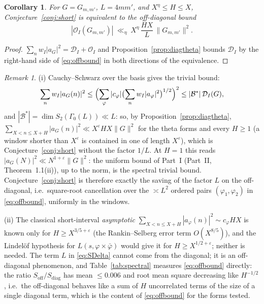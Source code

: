 \documentclass[11pt]{amsart}
\newtheorem{corollary}[theorem]{Corollary}
\theoremstyle{remark}
\newtheorem{remark}[theorem]{Remark}
\newcommand{\cB}{\mathcal{B}}
\newcommand{\e}{\varepsilon}
\begin{document}
\begin{corollary}\label{cor:equiv}
For $G=G_{m,m'}$, $L=4mm'$, and $X^\eta\le H\le X$, Conjecture~\ref{conj:short} is equivalent to the off-diagonal bound
\begin{equation}\label{eq:offbound}
|\mathcal O_I(G_{m,m'})|\ \ll_\eta\ X^{\eta}\,\frac{HX}{L}\,\|G_{m,m'}\|^2 .
\end{equation}
\end{corollary}
\begin{proof}
$\sum_nw_I|a_G|^2=\mathcal D_I+\mathcal O_I$ and Proposition~\ref{prop:diagtheta} bounds $\mathcal D_I$ by the right-hand side of \eqref{eq:offbound} in both directions of the equivalence.
\end{proof}

\begin{remark}\label{rem:trivial}
(i) Cauchy--Schwarz over the basis gives the trivial bound:
\[
\sum_nw_I|a_G(n)|^2\le\Bigl(\sum_\varphi|c_\varphi|\bigl(\sum_nw_I|a_\varphi|^2\bigr)^{1/2}\Bigr)^2\le|\cB^*|\,\mathcal D_I(G),
\]
and $|\cB^*|=\dim S_2(\Gamma_0(L))\ll L$: so, by Proposition~\ref{prop:diagtheta}, $\sum_{X<n\le X+H}|a_G(n)|^2\ll X^\e HX\|G\|^2$ for the theta forms and every $H\ge1$ (a window shorter than $X^\e$ is contained in one of length $X^\e$), which is Conjecture~\ref{conj:short} without the factor $1/L$. At $H=1$ this reads $|a_G(N)|^2\ll N^{1+\e}\|G\|^2$: the uniform bound of Part~I (Part~II, Theorem~1.1(ii)), up to the norm, is the spectral trivial bound. Conjecture~\ref{conj:short} is therefore exactly the saving of the factor $L$ on the off-diagonal, i.e.\ square-root cancellation over the $\asymp L^2$ ordered pairs $(\varphi_1,\varphi_2)$ in \eqref{eq:offbound}, uniformly in the windows.

(ii) The classical short-interval \emph{asymptotic} $\sum_{X<n\le X+H}|a_\varphi(n)|^2\sim c_\varphi HX$ is known only for $H\ge X^{3/5+\e}$ (the Rankin--Selberg error term $O(X^{8/5})$), and the Lindel\"of hypothesis for $L(s,\varphi\times\bar\varphi)$ would give it for $H\ge X^{1/2+\e}$; neither is needed. The term $L$ in \eqref{eq:SDelta} cannot come from the diagonal; it is an off-diagonal phenomenon, and Table~\ref{tab:spectral} measures \eqref{eq:offbound} directly: the ratio $S_{\mathrm{off}}/S_{\mathrm{diag}}$ has mean $\le0.006$ and root mean square decreasing like $H^{-1/2}$, i.e.\ the off-diagonal behaves like a sum of $H$ uncorrelated terms of the size of a single diagonal term, which is the content of \eqref{eq:offbound} for the forms tested.
\end{remark}
\end{document}
